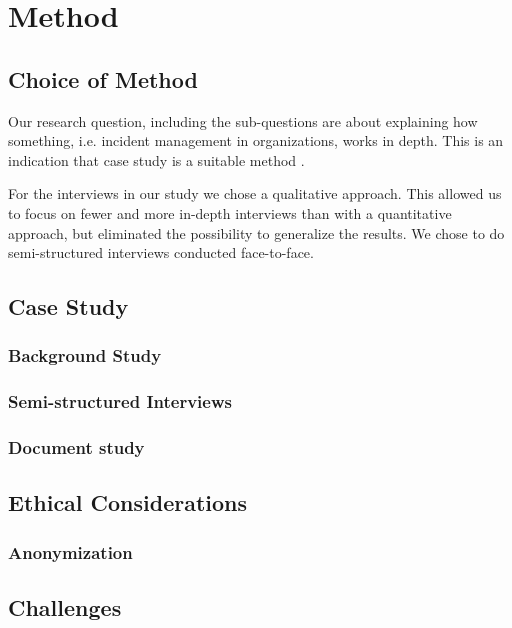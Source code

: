 \chapter{Method}

\section{Choice of Method}

Our research question, including the sub-questions are about explaining how something, i.e. incident management in organizations, works in depth. This is an indication that case study is a suitable method \cite{kitchenham1995case}. %

For the interviews in our study we chose a qualitative approach. This allowed us to focus on fewer and more in-depth interviews than with a quantitative approach, but eliminated the possibility to generalize the results. We chose to do semi-structured interviews conducted face-to-face. 

\section{Case Study}

\subsection{Background Study}
\subsection{Semi-structured Interviews}
\subsection{Document study}

\section{Ethical Considerations}
\subsection{Anonymization}

\section{Challenges}